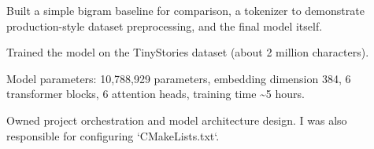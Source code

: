 \begin{cventries}
{\begin{cvitems}
      \item {Built a simple bigram baseline for comparison, a tokenizer to demonstrate production-style dataset preprocessing, and the final model itself.}
      \item {Trained the model on the TinyStories dataset (about 2 million characters).}
      \item {Model parameters: 10,788,929 parameters, embedding dimension 384, 6 transformer blocks, 6 attention heads, training time \textasciitilde{}5 hours.}
      \item {Owned project orchestration and model architecture design. I was also responsible for configuring `CMakeLists.txt`.}
    \end{cvitems}
  }

\end{cventries}
